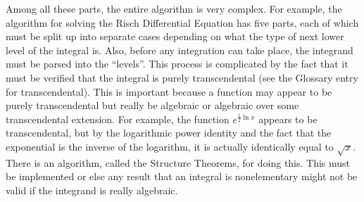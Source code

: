 Among all these parts, the entire algorithm is very complex.  For
example, the algorithm for solving the Risch Differential Equation has
five parts, each of which must be split up into separate cases depending
on what the type of next lower level of the integral is. Also, before
any \gls{integration} can take place, the \gls{integrand} must be parsed
into the ``levels''.  This process is complicated by the fact that it
must be verified that the integral is purely \gls{transcendental} (see
the Glossary entry for \gls{transcendental}).  This is important because
a function may appear to be purely \gls{transcendental} but really be
\gls{algebraic} or \gls{algebraic} over some \gls{transcendental}
extension.  For example, the function $e^{\frac{1}{2}\ln{x}}$ appears to
be transcendental, but by the logarithmic power identity and the fact
that the exponential is the inverse of the logarithm, it is actually
identically equal to $\sqrt{x}$.  There is an algorithm, called the
Structure Theorems, for doing this.  This must be implemented or else
any result that an integral is nonelementary might not be valid
if the \gls{integrand} is really \gls{algebraic}.  